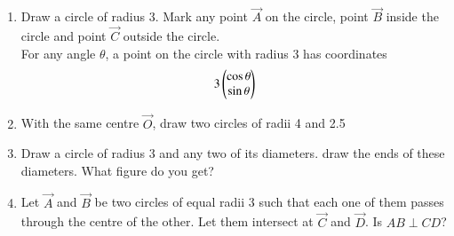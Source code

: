 \documentclass[journal,12pt,twocolumn]{IEEEtran}
\renewcommand\thesection{\arabic{section}}
\begin{document}
\begin{enumerate}[label=\thesection.\arabic*
,ref=\thesection.\theenumi]
\item Draw a circle of radius 3.  Mark any point $\vec{A}$ on the circle, point  $\vec{B}$ inside the circle  and point  $\vec{C}$ outside the circle.
\\
\solution 
For any angle $\theta$, a point on the circle with radius 3 has coordinates
\begin{align}
3\begin{pmatrix}\cos \theta\\ \sin\theta\end{pmatrix}
\end{align}
\item With the same centre $\vec{O}$,  draw two circles of radii 4 and 2.5
\item Draw a circle of radius 3 and any two of its diameters.  draw the ends of these diameters. What figure do you get?
\item Let $\vec{A}$ and $\vec{B}$ be two circles of equal radii 3 such that each one of them passes through the centre of the other.  Let them intersect at $\vec{C}$ and $\vec{D}$.  Is $AB \perp CD$?


\end{enumerate}
\end{document}
